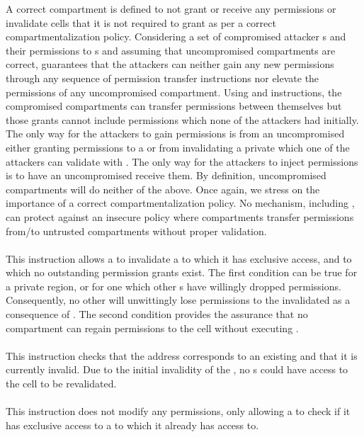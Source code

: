 A correct compartment is defined to not grant or receive any permissions 
or invalidate cells that it is not required to grant as per a correct
compartmentalization policy.
Considering a set of compromised attacker \secdiv{}s and their permissions 
to \cell{}s and assuming that uncompromised compartments are correct,
\seccells guarantees that the attackers can neither gain any new permissions 
through any sequence of permission transfer instructions 
nor elevate the permissions of any uncompromised compartment.
Using \scgrant and \screcv instructions, the compromised compartments can
transfer permissions between themselves but those grants cannot include 
permissions which none of the attackers had initially.
The only way for the attackers to gain permissions is from
an uncompromised \secdiv either granting permissions to a \cell or from 
invalidating a private \cell which one of the attackers can validate with \screval.
The only way for the attackers to inject permissions is to have an
uncompromised \secdiv receive them.
By definition, uncompromised compartments will do neither of the above.
Once again, we stress on the importance of a correct compartmentalization
policy.
No mechanism, including \seccells, can protect against an insecure policy
where compartments transfer permissions from/to untrusted compartments
without proper validation.

\paragraph{\scinval} 
This instruction allows a \secdiv to invalidate a \cell to which
it has exclusive access, and to which no outstanding permission grants
exist.
The first condition can be true for a private region, or for one
which other \secdiv{}s have willingly dropped permissions.
Consequently, no other \secdiv will unwittingly lose permissions to
the invalidated \cell as a consequence of \scinval.
The second condition provides the assurance that no compartment can
regain permissions to the cell without executing \screval.

\paragraph{\screval} 
This instruction checks that the address corresponds to an existing 
\cell{} and that it is currently invalid. 
Due to the initial invalidity of the \cell, no \secdiv{}s could have
access to the cell to be revalidated.

\paragraph{\scexcl}
This instruction does not modify any permissions, only allowing a
\secdiv{} to check if it has exclusive access to a \cell{} to which
it already has access to.

